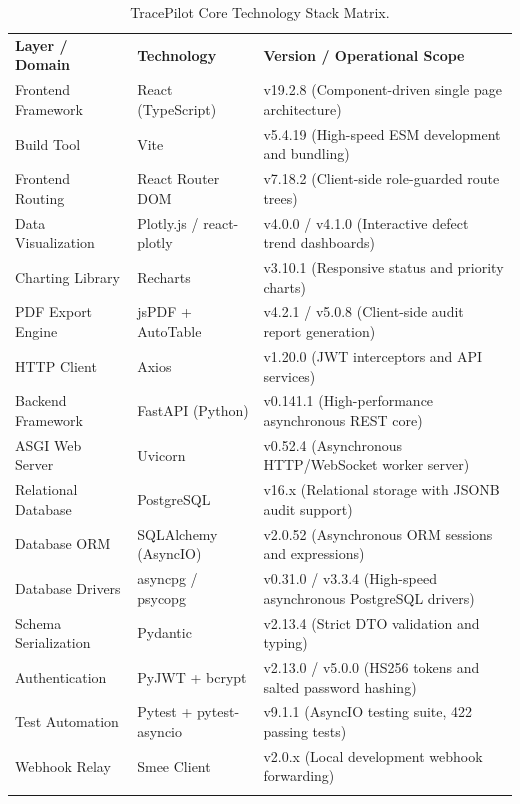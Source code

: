 \documentclass[11pt,a4paper]{article}
\providecommand{\toprule}{\noalign{\hrule height 1.2pt}}
\providecommand{\midrule}{\noalign{\hrule height 0.6pt}}
\providecommand{\bottomrule}{\noalign{\hrule height 1.2pt}}
\begin{document}
\begin{table}[htbp]
\centering
\small
\caption{TracePilot Core Technology Stack Matrix.}
\label{tab:tech_stack}
\begin{tabularx}{\textwidth}{llp{7.5cm}}
\toprule
\textbf{Layer / Domain} & \textbf{Technology} & \textbf{Version / Operational Scope} \\
\midrule
Frontend Framework & React (TypeScript) & v19.2.8 (Component-driven single page architecture) \\
Build Tool & Vite & v5.4.19 (High-speed ESM development and bundling) \\
Frontend Routing & React Router DOM & v7.18.2 (Client-side role-guarded route trees) \\
Data Visualization & Plotly.js / react-plotly & v4.0.0 / v4.1.0 (Interactive defect trend dashboards) \\
Charting Library & Recharts & v3.10.1 (Responsive status and priority charts) \\
PDF Export Engine & jsPDF + AutoTable & v4.2.1 / v5.0.8 (Client-side audit report generation) \\
HTTP Client & Axios & v1.20.0 (JWT interceptors and API services) \\
Backend Framework & FastAPI (Python) & v0.141.1 (High-performance asynchronous REST core) \\
ASGI Web Server & Uvicorn & v0.52.4 (Asynchronous HTTP/WebSocket worker server) \\
Relational Database & PostgreSQL & v16.x (Relational storage with JSONB audit support) \\
Database ORM & SQLAlchemy (AsyncIO) & v2.0.52 (Asynchronous ORM sessions and expressions) \\
Database Drivers & asyncpg / psycopg & v0.31.0 / v3.3.4 (High-speed asynchronous PostgreSQL drivers) \\
Schema Serialization & Pydantic & v2.13.4 (Strict DTO validation and typing) \\
Authentication & PyJWT + bcrypt & v2.13.0 / v5.0.0 (HS256 tokens and salted password hashing) \\
Test Automation & Pytest + pytest-asyncio & v9.1.1 (AsyncIO testing suite, 422 passing tests) \\
Webhook Relay & Smee Client & v2.0.x (Local development webhook forwarding) \\
\bottomrule
\end{tabularx}
\end{table}
\end{document}
